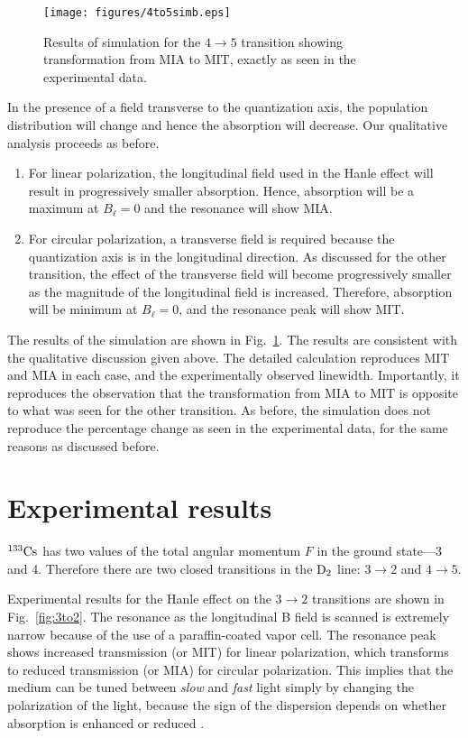 \begin{enumerate}
\begin{figure}[h]
	\centering
	\texttt{[image: figures/4to5simb.eps]}
	\caption{Results of simulation for the $ 4 \rightarrow 5 $ transition showing transformation from MIA to MIT, exactly as seen in the experimental data.}
	\label{fig:4to5sim}
\end{figure}

In the presence of a field transverse to the quantization axis, the population distribution will change and hence the absorption will decrease. Our qualitative analysis proceeds as before. 
\begin{enumerate}
	\item For linear polarization, the longitudinal field used in the Hanle effect will result in progressively smaller absorption. Hence, absorption will be a maximum at $ B_{\ell} =0 $ and the resonance will show MIA.

\item For circular polarization, a transverse field is required because the quantization axis is in the longitudinal direction. As discussed for the other transition, the effect of the transverse field will become progressively smaller as the magnitude of the longitudinal field is increased. Therefore, absorption will be minimum at $ B_{\ell} = 0 $, and the resonance peak will show MIT.
\end{enumerate}

The results of the simulation are shown in Fig.\ \ref{fig:4to5sim}. The results are consistent with the qualitative discussion given above. The detailed calculation reproduces MIT and MIA in each case, and the experimentally observed linewidth. Importantly, it reproduces the observation that the transformation from MIA to MIT is opposite to what was seen for the other transition. As before, the simulation does not reproduce the percentage change as seen in the experimental data, for the same reasons as discussed before.

\section{Experimental results}

${\rm^{133}Cs}$ has two values of the total angular momentum $ F $ in the ground state---3 and 4. Therefore there are two closed transitions in the $\rm D_2 $ line: $ 3 \rightarrow 2 $ and $ 4 \rightarrow 5 $.

Experimental results for the Hanle effect on the $ 3 \rightarrow 2 $ transitions are shown in Fig.\ \ref{fig:3to2}. The resonance as the longitudinal B field is scanned is extremely narrow  because of the use of a paraffin-coated vapor cell. The resonance peak shows increased transmission (or MIT) for linear polarization, which transforms to reduced transmission (or MIA) for circular polarization. This implies that the medium can be tuned between \textit{slow} and \textit{fast} light simply by changing the polarization of the light, because the sign of the dispersion depends on whether absorption is enhanced or reduced \cite{BHN15}.


\end{enumerate}
